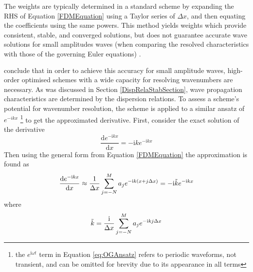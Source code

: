 The weights are typically determined in a standard scheme by expanding the RHS of Equation \ref{FDMEquation} using a Taylor series of $\Delta x$, and then equating the coefficients using the same powers. This method yields weights which provide consistent, stable, and converged solutions, but does not guarantee accurate wave solutions for small amplitudes waves (when comparing the resolved characteristics with those of the governing Euler equations) \cite{spisso2007overviewfd}.

\textcite{hardin1995caaworkshop} conclude that in order to achieve this accuracy for small amplitude waves, high-order optimised schemes with a wide capacity for resolving wavenumbers are necessary. As was discussed in Section \ref{DispRelaStabSection}, wave propagation characteristics are determined by the dispersion relations. To assess a scheme's potential for wavenumber resolution, the scheme is applied to a similar ansatz of $e^{-ikx}$ \footnote[1]{the $e^{\mathrm{i}\omega t}$ term in Equation \ref{eq:OGAnsatz} refers to periodic waveforms, not transient, and can be omitted for brevity due to its appearance in all terms} to get the approximated derivative. First, consider the exact solution of the derivative
\begin{equation}
    \frac{\mathrm{d}e^{-\mathrm{i}kx}}{\mathrm{d}x} = -\mathrm{i}k e^{-\mathrm{i}kx}
\end{equation}
Then using the general form from Equation \ref{FDMEquation} the approximation is found as
\begin{equation}
    \frac{\mathrm{d}e^{-\mathrm{i}kx}}{\mathrm{d}x} \approx \frac{1}{\Delta x} \sum^M_{j=-N} a_j e^{-\mathrm{i}k\left(x+j\Delta x\right)} \\
    = - \mathrm{i}\Tilde{k}e^{-\mathrm{i}kx}
\end{equation}
where
\begin{equation}
    \Tilde{k} = \frac{\mathrm{i}}{\Delta x} \sum^M_{j=-N} a_j e^{-\mathrm{i}kj\Delta x}
\end{equation}

